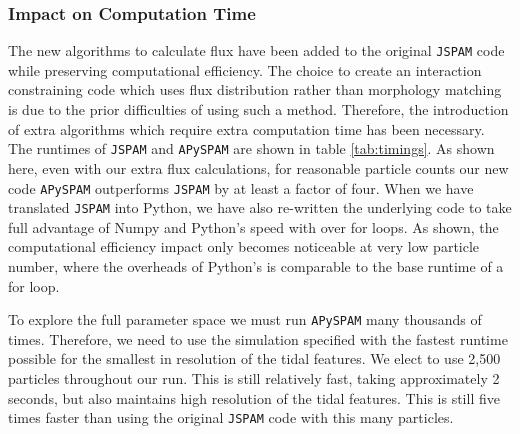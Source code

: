 \subsubsection{Impact on Computation Time}
The new algorithms to calculate flux have been added to the original \texttt{JSPAM} code while preserving computational efficiency. The choice to create an interaction constraining code which uses flux distribution rather than morphology matching is due to the prior difficulties of using such a method. Therefore, the introduction of extra algorithms which require extra computation time has been necessary. The runtimes of \texttt{JSPAM} and \texttt{APySPAM} are shown in table \ref{tab:timings}. As shown here, even with our extra flux calculations, for reasonable particle counts our new code \texttt{APySPAM} outperforms \texttt{JSPAM} by at least a factor of four. When we have translated \texttt{JSPAM} into Python, we have also re-written the underlying code to take full advantage of Numpy and Python's speed with \DIFdelbegin {}\DIFdelend \DIFaddbegin {}\DIFaddend over for loops. As shown, the computational efficiency impact only becomes noticeable at very low particle number, where the overheads of Python's \DIFdelbegin {}\DIFdelend \DIFaddbegin {}\DIFaddend is comparable to the base runtime of a for loop.

To explore the full parameter space we must run \texttt{APySPAM} many thousands of times. Therefore, we need to use the simulation specified with the fastest runtime possible for the smallest \DIFdelbegin {}\DIFdelend \DIFaddbegin {}\DIFaddend in resolution of the tidal features. We elect to use 2,500 particles throughout our run. This is still relatively fast, taking approximately 2 seconds, but also maintains high resolution of the tidal features. This is still five times faster than using the original \texttt{JSPAM} code with this many particles. 

